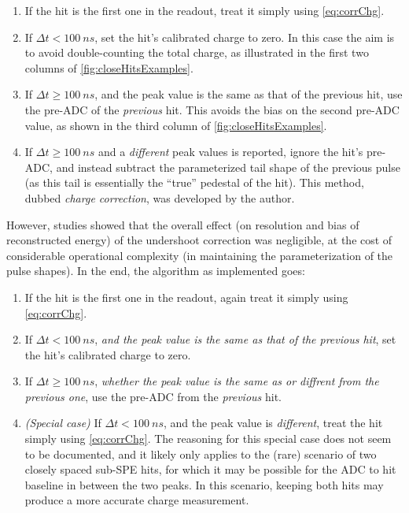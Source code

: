 \documentclass[../thesis.tex]{subfiles}
\begin{document}
\begin{enumerate}
\item If the hit is the first one in the readout, treat it simply using \eqref{eq:corrChg}.
\item If $\Delta t < \SI{100}{ns}$, set the hit's calibrated charge to zero. In this case the aim is to avoid double-counting the total charge, as illustrated in the first two columns of \autoref{fig:closeHitsExamples}.
\item If $\Delta t \ge \SI{100}{ns}$, and the peak value is the same as that of the previous hit, use the pre-ADC of the \emph{previous} hit. This avoids the bias on the second pre-ADC value, as shown in the third column of \autoref{fig:closeHitsExamples}.
\item If $\Delta t \ge \SI{100}{ns}$ and a \emph{different} peak values is reported, ignore the hit's pre-ADC, and instead subtract the parameterized tail shape of the previous pulse (as this tail is essentially the ``true'' pedestal of the hit). This method, dubbed \emph{charge correction}, was developed by the author.
\end{enumerate}

However, studies showed that the overall effect (on resolution and bias of reconstructed energy) of the undershoot correction was negligible, at the cost of considerable operational complexity (in maintaining the parameterization of the pulse shapes). In the end, the algorithm as implemented goes:

\begin{enumerate}
\item If the hit is the first one in the readout, again treat it simply using \eqref{eq:corrChg}.
\item If $\Delta t < \SI{100}{ns}$, \emph{and the peak value is the same as that of the previous hit}, set the hit's calibrated charge to zero.
\item If $\Delta t \ge \SI{100}{ns}$, \emph{whether the peak value is the same as or diffrent from the previous one}, use the pre-ADC from the \emph{previous} hit.
\item \emph{(Special case)} If $\Delta t < \SI{100}{ns}$, and the peak value is \emph{different}, treat the hit simply using \eqref{eq:corrChg}. The reasoning for this special case does not seem to be documented, and it likely only applies to the (rare) scenario of two closely spaced sub-SPE hits, for which it may be possible for the ADC to hit baseline in between the two peaks. In this scenario, keeping both hits may produce a more accurate charge measurement.
\end{enumerate}
\end{document}
